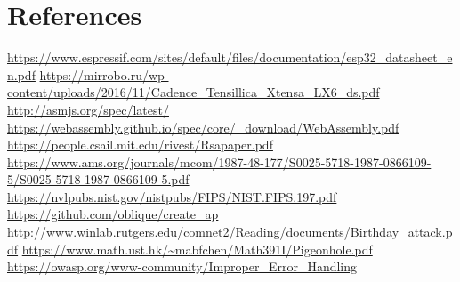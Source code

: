 \documentclass{article}
\begin{document}
\section{References}
\begin{thebibliography}{9}
	\url{https://www.espressif.com/sites/default/files/documentation/esp32_datasheet_en.pdf}
	\url{https://mirrobo.ru/wp-content/uploads/2016/11/Cadence_Tensillica_Xtensa_LX6_ds.pdf}
	\url{http://asmjs.org/spec/latest/}
	\url{https://webassembly.github.io/spec/core/_download/WebAssembly.pdf}
	\url{https://people.csail.mit.edu/rivest/Rsapaper.pdf}
	\url{https://www.ams.org/journals/mcom/1987-48-177/S0025-5718-1987-0866109-5/S0025-5718-1987-0866109-5.pdf}
	\url{https://nvlpubs.nist.gov/nistpubs/FIPS/NIST.FIPS.197.pdf}
	\url{https://github.com/oblique/create_ap}
	\url{http://www.winlab.rutgers.edu/comnet2/Reading/documents/Birthday_attack.pdf}
	\url{https://www.math.ust.hk/~mabfchen/Math391I/Pigeonhole.pdf}
  \url{https://owasp.org/www-community/Improper_Error_Handling}
\end{thebibliography}
\end{document}
